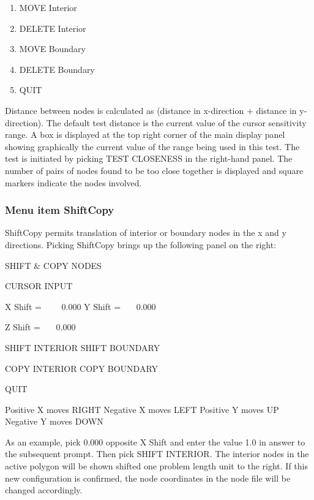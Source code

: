 \documentclass{article}
\begin{document}
\begin{enumerate}
\item MOVE Interior
\item DELETE Interior
\item MOVE Boundary
\item DELETE Boundary
\item QUIT
\end{enumerate}
Distance between nodes is calculated as (distance in x-direction + distance in y-direction). The default test distance is the current value of the cursor sensitivity range. A box is displayed at the top right corner of the main display panel showing graphically the current value of the range being used in this test. The test is initiated by picking TEST CLOSENESS in the right-hand panel. The number of pairs of nodes found to be too close together is displayed and square markers indicate the nodes involved. 

\subsubsection[Menu item ShiftCopy]{Menu item ShiftCopy}
ShiftCopy permits translation of interior or boundary nodes in the x and y directions. Picking ShiftCopy brings up the following panel on the right:

SHIFT \& COPY NODES

CURSOR INPUT


\bigskip

X Shift = \ \ \ \ 0.000\newline
Y Shift = \ \ \ 0.000

Z Shift = \ \ \ 0.000


\bigskip

SHIFT INTERIOR\newline
SHIFT BOUNDARY

COPY INTERIOR\newline
COPY BOUNDARY

QUIT

Positive X moves RIGHT\newline
Negative X moves LEFT\newline
Positive Y moves UP\newline
Negative Y moves DOWN

As an example, pick 0.000 opposite X Shift and enter the value 1.0 in answer to the subsequent prompt. Then pick SHIFT INTERIOR. The interior nodes in the active polygon will be shown shifted one problem length unit to the right. If this new configuration is confirmed, the node coordinates in the node file will be changed accordingly.
\end{document}
